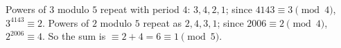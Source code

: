Powers of $3$ modulo $5$ repeat with period $4$: $3,4,2,1$; since $4143\equiv3\pmod4$, $3^{4143}\equiv2$. Powers of $2$ modulo $5$ repeat as $2,4,3,1$; since $2006\equiv2\pmod4$, $2^{2006}\equiv4$. So the sum is $\equiv2+4=6\equiv\boxed{1}\pmod5$.
